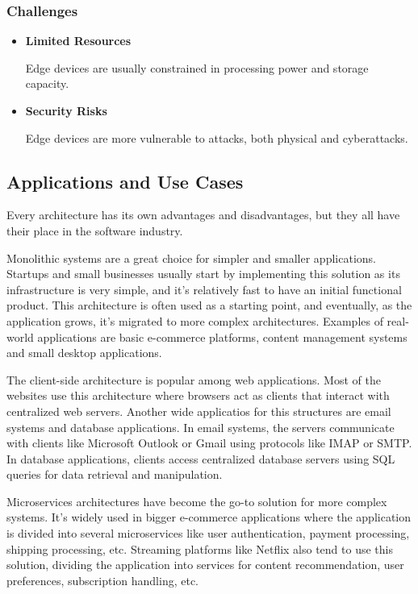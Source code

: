 \subsubsection{Challenges}
\begin{itemize}

	\item \textbf{Limited Resources}

	      Edge devices are usually constrained in processing power and storage capacity.

	\item \textbf{Security Risks}

	      Edge devices are more vulnerable to attacks, both physical and cyberattacks.

\end{itemize}

\subsection{Applications and Use Cases}
Every architecture has its own advantages and disadvantages, but they all have
their place in the software industry.

Monolithic systems are a great choice for simpler and smaller applications.
Startups and small businesses usually start by implementing this solution as
its infrastructure is very simple, and it's relatively fast to have an initial
functional product. This architecture is often used as a starting point, and
eventually, as the application grows, it's migrated to more complex architectures.
Examples of real-world applications are basic e-commerce platforms, content
management systems and small desktop applications.

The client-side architecture is popular among web applications. Most of the
websites use this architecture where browsers act as clients that interact with
centralized web servers. Another wide applicatios for this structures are email
systems and database applications. In email systems, the servers communicate
with clients like Microsoft Outlook or Gmail using protocols like \gls{IMAP} or \gls{SMTP}.
In database applications, clients access centralized database servers using
\gls{SQL} queries for data retrieval and manipulation.

Microservices architectures have become the go-to solution for more complex
systems. It's widely used in bigger e-commerce applications where the application
is divided into several microservices like user authentication, payment processing,
shipping processing, etc. Streaming platforms like Netflix also tend to use this
solution, dividing the application into services for content recommendation, user
preferences, subscription handling, etc.

